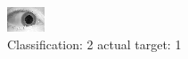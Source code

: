 \begin{figure}[h!]
\begin{center}
\includegraphics[width=0.60\columnwidth]{figures/ID1586_class_2_target_1.png}
\end{center}
\caption{ Classification: 2 actual target: 1}
\label{fig:ID1586_class_2_target_1}
\end{figure}
